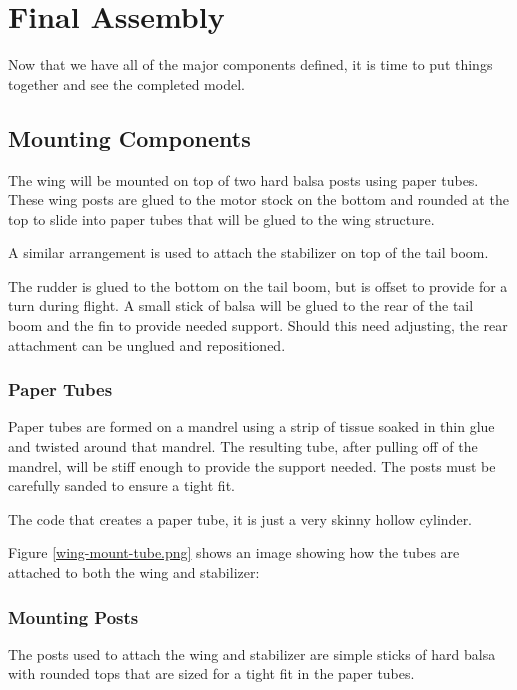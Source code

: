 \section{Final Assembly}

Now that we have all of the major components defined, it is time to put things
together and see the completed model.

\subsection{Mounting Components}

The wing will be mounted on top of two hard balsa posts using paper tubes.
These wing posts are glued to the motor stock on the bottom and rounded at the
top to slide into paper tubes that will be glued to the wing structure.

A similar arrangement is used to attach the stabilizer on top of the tail boom.

The rudder is glued to the bottom on the tail boom, but is offset to provide for
a turn during flight. A small stick of balsa will be glued to the rear of the
tail boom and the fin to provide needed support. Should this need adjusting,
the rear attachment can be unglued and repositioned.

\subsubsection{Paper Tubes}

Paper tubes are formed on a mandrel using a strip of tissue soaked in thin
glue and twisted around that mandrel. The resulting tube, after pulling off of
the mandrel, will be stiff enough to provide the support needed. The posts must
be carefully sanded to ensure a tight fit.

The code that creates a paper tube, it is just a very skinny hollow cylinder.

Figure \ref{wing-mount-tube.png} shows an image showing how the tubes are attached
to both the wing and stabilizer:


\subsubsection{Mounting Posts}

The posts used to attach the wing and stabilizer are simple sticks of hard balsa with
rounded tops that are sized for a tight fit in the paper tubes.


